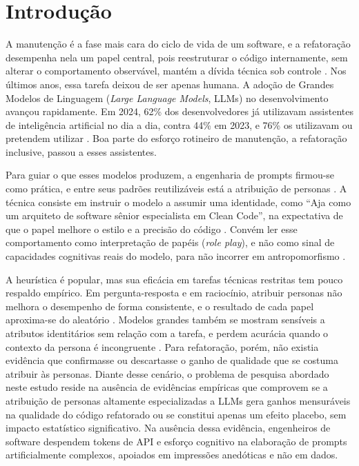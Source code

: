 \documentclass[10pt,conference,a4paper,twocolumn]{article}
\begin{document}
\section{Introdução}
A manutenção é a fase mais cara do ciclo de vida de um software, e a refatoração desempenha nela um papel central, pois reestruturar o código internamente, sem alterar o comportamento observável, mantém a dívida técnica sob controle \cite{fowler}. Nos últimos anos, essa tarefa deixou de ser apenas humana. A adoção de Grandes Modelos de Linguagem (\textit{Large Language Models}, LLMs) no desenvolvimento avançou rapidamente. Em 2024, 62\% dos desenvolvedores já utilizavam assistentes de inteligência artificial no dia a dia, contra 44\% em 2023, e 76\% os utilizavam ou pretendem utilizar \cite{stackoverflow}. Boa parte do esforço rotineiro de manutenção, a refatoração inclusive, passou a esses assistentes.

Para guiar o que esses modelos produzem, a engenharia de prompts firmou-se como prática, e entre seus padrões reutilizáveis está a atribuição de personas \cite{white2023}. A técnica consiste em instruir o modelo a assumir uma identidade, como ``Aja como um arquiteto de software sênior especialista em Clean Code'', na expectativa de que o papel melhore o estilo e a precisão do código \cite{white2023}. Convém ler esse comportamento como interpretação de papéis (\textit{role play}), e não como sinal de capacidades cognitivas reais do modelo, para não incorrer em antropomorfismo \cite{shanahan2023}.

A heurística é popular, mas sua eficácia em tarefas técnicas restritas tem pouco respaldo empírico. Em pergunta-resposta e em raciocínio, atribuir personas não melhora o desempenho de forma consistente, e o resultado de cada papel aproxima-se do aleatório \cite{zheng2024}. Modelos grandes também se mostram sensíveis a atributos identitários sem relação com a tarefa, e perdem acurácia quando o contexto da persona é incongruente \cite{araujo2025}. Para refatoração, porém, não existia evidência que confirmasse ou descartasse o ganho de qualidade que se costuma atribuir às personas. Diante desse cenário, o problema de pesquisa abordado neste estudo reside na ausência de evidências empíricas que comprovem se a atribuição de personas altamente especializadas a LLMs gera ganhos mensuráveis na qualidade do código refatorado ou se constitui apenas um efeito placebo, sem impacto estatístico significativo. Na ausência dessa evidência, engenheiros de software despendem tokens de API e esforço cognitivo na elaboração de prompts artificialmente complexos, apoiados em impressões anedóticas e não em dados.
\end{document}
